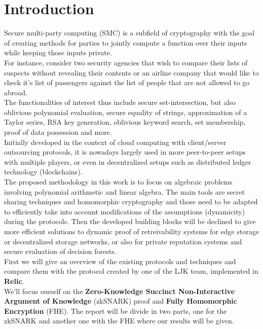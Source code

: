 \chapter{Introduction} 

Secure multi-party computing (SMC) is a subfield of cryptography with the goal of creating methods for parties to jointly compute a function over their inputs while keeping those inputs private. \\

For instance, consider two security agencies that wish to compare their lists of suspects without revealing their contents or an airline company that would like to check it's list of passengers against the list of people that are not allowed to go abroad. \\

The functionalities of interest thus include secure set-intersection, but also oblivious polynomial evaluation, secure equality of strings, approximation of a Taylor series, RSA key generation, oblivious keyword search, set membership, proof of data possession and more. \\

Initially developed in the context of cloud computing with client/server outsourcing protocols, it is nowadays largely used in more peer-to-peer setups with multiple players, or even in decentralized setups such as distributed ledger technology (blockchains). \\

The proposed methodology in this work is to focus on algebraic problems involving polynomial arithmetic and linear algebra. The main tools are secret sharing techniques and homomorphic cryptography and those need to be adapted to efficiently take into account modifications of the assumptions (dynamicity) during the protocols. Then the developed building blocks will be declined to give more efficient solutions to dynamic proof of retreivability systems for edge storage or decentralized storage networks, or also for private reputation systems and secure evaluation of decision forests. \\

First we will give an overview of the existing protocols and techniques and compare them with the protocol created by one of the LJK team, implemented in \textbf{Relic}. \\

We'll focus ourself on the \textbf{Zero-Knowledge Succinct Non-Interactive Argument of Knowledge} (zkSNARK) proof and \textbf{Fully Homomorphic Encryption} (FHE). The report will be divide in two parts, one for the zkSNARK and another one with the FHE where our results will be given. \\

